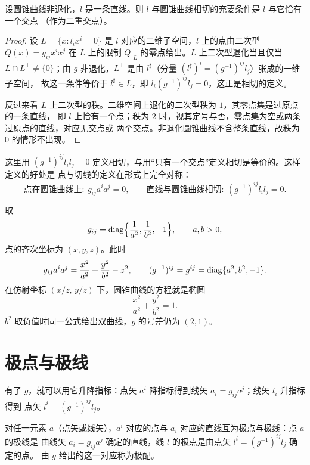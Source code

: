 \begin{proposition}
设圆锥曲线非退化，$l$ 是一条直线。则 $l$ 与圆锥曲线相切的充要条件是 $l$ 与它恰有一个交点
（作为二重交点）。
\end{proposition}

\begin{proof}
设 $L=\{x:l_ix^i=0\}$ 是 $l$ 对应的二维子空间，$l$ 上的点由二次型 $Q(x)=g_{ij}x^ix^j$
在 $L$ 上的限制 $Q|_L$ 的零点给出。$L$ 上二次型退化当且仅当 $L\cap L^\perp\neq\{0\}$；由 $g$
非退化，$L^\perp$ 是由 $l^\sharp$（分量 $(l^\sharp)^i=(g^{-1})^{ij}l_j$）张成的一维子空间，
故这一条件等价于 $l^\sharp\in L$，即 $l_i(g^{-1})^{ij}l_j=0$，这正是相切的定义。

反过来看 $L$ 上二次型的秩。二维空间上退化的二次型秩为 $1$，其零点集是过原点的一条直线，
即 $l$ 上恰有一个点；秩为 $2$ 时，视其定号与否，零点集为空或两条过原点的直线，对应无交点或
两个交点。非退化圆锥曲线不含整条直线，故秩为 $0$ 的情形不出现。
\end{proof}

\begin{remark}
这里用 $(g^{-1})^{ij}l_il_j=0$ 定义相切，与用“只有一个交点”定义相切是等价的。这样定义的好处是
点与切线的定义在形式上完全对称：
\[
\text{点在圆锥曲线上}:\ g_{ij}a^ia^j=0,\qquad
\text{直线与圆锥曲线相切}:\ (g^{-1})^{ij}l_il_j=0 .
\]
\end{remark}

\begin{example}[标准形式]
取
\[
g_{ij}=\operatorname{diag}\Bigl\{\frac1{a^2},\frac1{b^2},-1\Bigr\},\qquad a,b>0,
\]
点的齐次坐标为 $(x,y,z)$。此时
\[
g_{ij}a^ia^j=\frac{x^2}{a^2}+\frac{y^2}{b^2}-z^2,
\qquad
(g^{-1})^{ij}=g^{ij}=\operatorname{diag}\{a^2,b^2,-1\}.
\]
在仿射坐标 $(x/z,\,y/z)$ 下，圆锥曲线的方程就是椭圆
\[
\frac{x^2}{a^2}+\frac{y^2}{b^2}=1 .
\]
$b^2$ 取负值时同一公式给出双曲线，$g$ 的号差仍为 $(2,1)$。
\end{example}

\section{极点与极线}

有了 $g$，就可以用它升降指标：点矢 $a^i$ 降指标得到线矢 $a_i=g_{ij}a^j$；线矢 $l_i$ 升指标得到
点矢 $l^i=(g^{-1})^{ij}l_j$。

\begin{definition}[极点与极线]
对任一元素 $a$（点矢或线矢），$a^i$ 对应的点与 $a_i$ 对应的直线互为极点与极线：点 $a$ 的极线是
由线矢 $a_i=g_{ij}a^j$ 确定的直线，线 $l$ 的极点是由点矢 $l^i=(g^{-1})^{ij}l_j$ 确定的点。
由 $g$ 给出的这一对应称为极配。
\end{definition}

